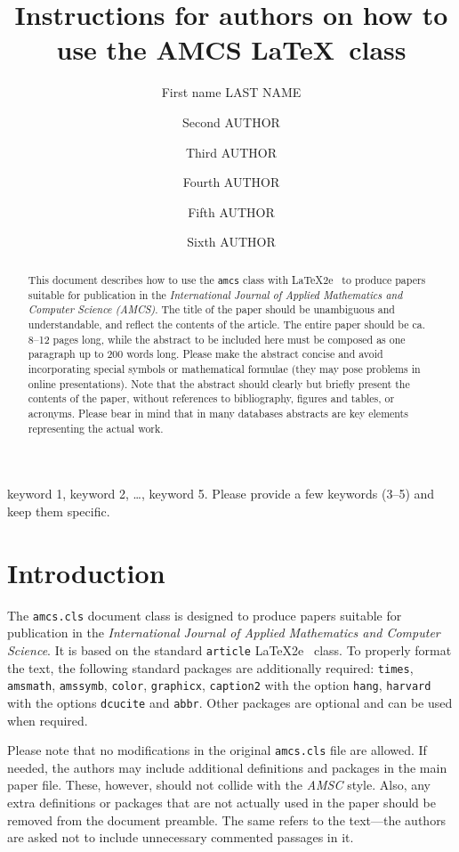 \documentclass{amcs}
\title[Instructions for authors on ...]{Instructions for authors on how to use the AMCS \LaTeX~class}
\author[ad1][ad2]{First name LAST NAME}
\author[ad1][]{Second AUTHOR}
\author[ad1][ad2]{Third AUTHOR}
\author[ad2][]{Fourth AUTHOR}
\author[ad1][ad2]{Fifth AUTHOR}
\author[ad2][]{Sixth AUTHOR}
\begin{document}
\begin{abstract}
This document describes how to use the \verb+amcs+ class with \LaTeX2e ~to produce papers suitable for publication in the \emph{International Journal of Applied Mathematics and Computer Science (AMCS)}. The title of the paper should be unambiguous and understandable, and reflect the contents of the article. The entire paper should be ca. 8--12 pages long, while the abstract to be included here must be composed as one paragraph up to 200 words long. Please make the abstract concise and avoid incorporating special symbols or mathematical formulae (they may pose problems in online presentations). Note that the abstract should clearly but briefly present the contents of the paper, without references to bibliography, figures and tables, or acronyms. Please bear in mind that in many databases abstracts are key elements representing the actual work.
\end{abstract}

\begin{keywords}
keyword 1, keyword 2, \dots, keyword 5. Please provide a few keywords (3--5) and keep them specific.
\end{keywords}
\maketitle

\section{Introduction}
The \verb+amcs.cls+ document class is designed to produce papers suitable for publication in the \emph{International Journal of Applied Mathematics and Computer Science}. It is based on the standard \verb+article+ \LaTeX2e ~class. To properly format the text, the following standard packages are additionally required: \verb+times+, \verb+amsmath+, \verb+amssymb+, \verb+color+, \verb+graphicx+, \verb+caption2+ with the option \verb+hang+, \verb+harvard+ with the options \verb+dcucite+ and \verb+abbr+. Other packages are optional and can be used when required.

Please note that no modifications in the original \verb+amcs.cls+ file are allowed. If needed, the authors may include additional definitions and packages in the main paper file. These, however, should not collide with the \emph{AMSC} style. Also, any extra definitions or packages that are not actually used in the paper should be removed from the document preamble. The same refers to the text---the authors are asked not to include unnecessary commented passages in it.
\end{document}
